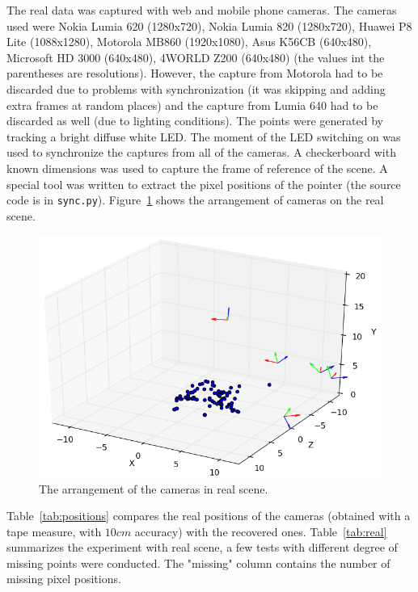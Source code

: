 \documentclass[12pt]{article}
\begin{document}
The real data was captured with web and mobile phone cameras. The cameras used
were Nokia Lumia 620 (1280x720), Nokia Lumia 820 (1280x720), Huawei P8 Lite
(1088x1280), Motorola MB860 (1920x1080), Asus K56CB (640x480), Microsoft HD 3000
(640x480), 4WORLD Z200 (640x480) (the values int the parentheses are resolutions).
However, the capture from Motorola had to be discarded due to problems with
synchronization (it was skipping and adding extra frames at random places) and
the capture from Lumia 640 had to be discarded as well (due to lighting conditions). The points were generated by
tracking a bright diffuse white LED. The moment of the LED switching on was used to
synchronize the captures from all of the cameras. A checkerboard with known dimensions was used to capture the frame of reference of the scene. A special tool was written to
extract the pixel positions of the pointer (the source code is in \texttt{sync.py}). Figure~\ref{fig:real} shows the arrangement of cameras on the real scene.

\begin{figure}[ht]
\centering
\includegraphics[scale=0.5]{real.png}
\caption{The arrangement of the cameras in real scene.}
\label{fig:real}
\end{figure}


Table~\ref{tab:positions} compares the real positions of the cameras (obtained with a tape measure, with $10cm$ accuracy) with the recovered ones. Table~\ref{tab:real} summarizes the experiment with real scene, a few tests with different degree of missing points were conducted. The "missing" column contains the number of missing pixel positions.
\end{document}
